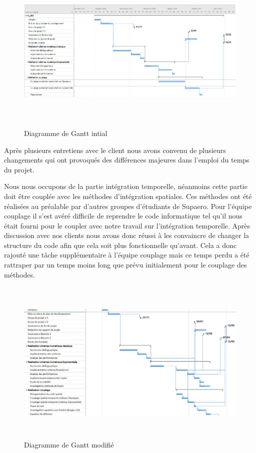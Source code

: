 \documentclass[a4paper,12pt]{report}
\theoremstyle{break}
\begin{document}
  \begin{figure}[h]
\centering
    \includegraphics[width=\textwidth, height=8cm]{images/Gant.png}
  	\caption{Diagramme de Gantt intial} 
   \label{fig:Gantt_initial}
\end{figure}

Après plusieurs entretiens avec le client nous avons convenu de plusieurs changements qui ont provoqués des différences majeures dans l’emploi du temps du projet. 

Nous nous occupons de la partie intégration temporelle, néanmoins cette partie doit être couplée avec les méthodes d’intégration spatiales. Ces méthodes ont été réalisées au préalable par d’autres groupes d’étudiants de Supaero. Pour l’équipe couplage il s’est avéré difficile de reprendre le code informatique tel qu’il nous était fourni pour le coupler avec notre travail sur l’intégration temporelle. Après discussion avec nos clients nous avons donc réussi à les convaincre de changer la structure du code afin que cela soit plus fonctionnelle qu’avant. Cela a donc rajouté une tâche supplémentaire à l’équipe couplage mais ce temps perdu a été rattraper par un temps moins long que prévu initialement pour le couplage des méthodes. 

  \begin{figure}[h]
\centering
    \includegraphics[width=\textwidth, height=8cm]{images/Gantt_revue_2.png}
  	\caption{Diagramme de Gantt modifié} 
   \label{fig:Gantt modifié}
\end{figure}
\end{document}
